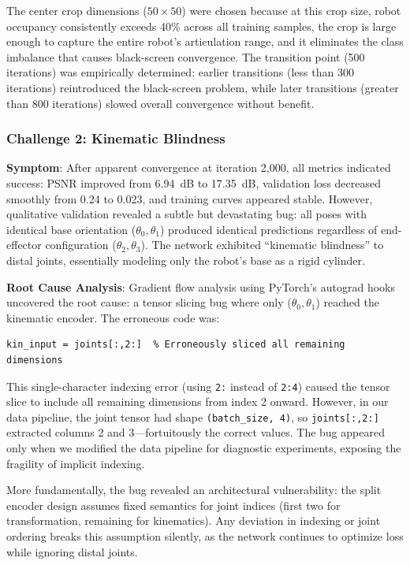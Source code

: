\documentclass[12pt,a4paper,oneside]{report}
\begin{document}
The center crop dimensions ($50 \times 50$) were chosen because at this crop size, robot occupancy consistently exceeds 40\% across all training samples, the crop is large enough to capture the entire robot's articulation range, and it eliminates the class imbalance that causes black-screen convergence. The transition point (500 iterations) was empirically determined: earlier transitions (less than 300 iterations) reintroduced the black-screen problem, while later transitions (greater than 800 iterations) slowed overall convergence without benefit.

\subsubsection{Challenge 2: Kinematic Blindness}
\textbf{Symptom}: After apparent convergence at iteration 2,000, all metrics indicated success: PSNR improved from 6.94~dB to 17.35~dB, validation loss decreased smoothly from 0.24 to 0.023, and training curves appeared stable. However, qualitative validation revealed a subtle but devastating bug: all poses with identical base orientation ($\theta_0, \theta_1$) produced identical predictions regardless of end-effector configuration ($\theta_2, \theta_3$). The network exhibited ``kinematic blindness'' to distal joints, essentially modeling only the robot's base as a rigid cylinder.

\textbf{Root Cause Analysis}: Gradient flow analysis using PyTorch's autograd hooks uncovered the root cause: a tensor slicing bug where only ($\theta_0, \theta_1$) reached the kinematic encoder. The erroneous code was:
\begin{verbatim}
kin_input = joints[:,2:]  % Erroneously sliced all remaining dimensions
\end{verbatim}
This single-character indexing error (using \texttt{2:} instead of \texttt{2:4}) caused the tensor slice to include all remaining dimensions from index 2 onward. However, in our data pipeline, the joint tensor had shape \texttt{(batch\_size, 4)}, so \texttt{joints[:,2:]} extracted columns 2 and 3---fortuitously the correct values. The bug appeared only when we modified the data pipeline for diagnostic experiments, exposing the fragility of implicit indexing.

More fundamentally, the bug revealed an architectural vulnerability: the split encoder design assumes fixed semantics for joint indices (first two for transformation, remaining for kinematics). Any deviation in indexing or joint ordering breaks this assumption silently, as the network continues to optimize loss while ignoring distal joints.
\end{document}
